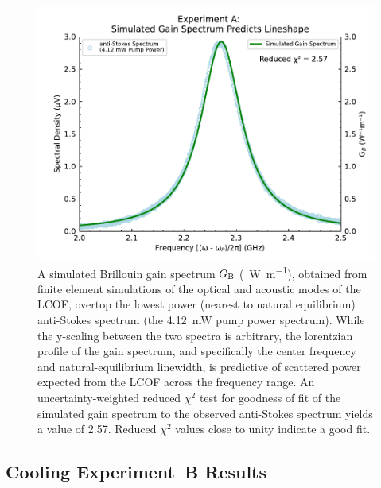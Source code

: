\begin{figure}[t!]
  \centering
  \includegraphics[width=\textwidth]{figs/2-Cooling/P-O Simulated Gain.pdf}
  \caption[A simulated Brillouin gain spectrum \(G_{\rm B}\) of the \ac{LCOF}, overtop the lowest power anti-Stokes spectrum.]{A simulated Brillouin gain spectrum \(G_{\rm B}\) (\si{\per\watt\per\meter}), obtained from finite element simulations \cite{johnson2023laser} of the optical and acoustic modes of the \ac{LCOF}, overtop the lowest power (nearest to natural equilibrium) anti-Stokes spectrum (the \SI{4.12}{\milli\watt} pump power spectrum). While the y-scaling between the two spectra is arbitrary, the lorentzian profile of the gain spectrum, and specifically the center frequency and natural-equilibrium linewidth, is predictive of scattered power expected from the \ac{LCOF} across the frequency range. An uncertainty-weighted reduced \(\chi^{2}\) test for goodness of fit of the simulated gain spectrum to the observed anti-Stokes spectrum yields a value of 2.57. Reduced \(\chi^{2}\) values close to unity indicate a good fit.}
  \label{fig:Cooling:P-O Simulated Gain}
\end{figure}


\subsection{Cooling Experiment~B Results}
\label{Cooling:subsec:ExperimentBResults}

